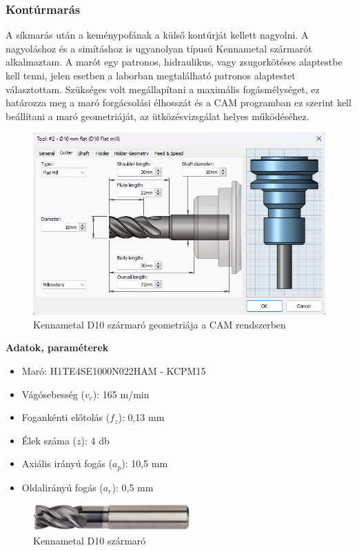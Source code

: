 \documentclass[12pt,a4paper,oneside]{report}
\begin{document}
\subsubsection{Kontúrmarás}
A síkmarás után a keménypofának a külső kontúrját kellett nagyolni. A nagyoláshoz és a simításhoz is ugyanolyan típusú Kennametal szármarót alkalmaztam. A marót egy patronos, hidraulikus, vagy zsugorkötéses alaptestbe kell tenni, jelen esetben a laborban megtalálható patronos alaptestet választottam. Szükséges volt megállapítani a maximális fogásmélységet, ez határozza meg a maró forgácsolási élhosszát és a CAM programban ez szerint kell beállítani a maró geometriáját, az ütközésvizsgálat helyes működéséhez.

\begin{figure}[H]
    \centering
    \includegraphics[width=12.5cm]{figures/d10_flat_geometry.png}
    \caption{Kennametal D10 szármaró geometriája a CAM rendszerben}
    \label{Fig:d10_flat_geometry}
\end{figure}

\textbf{Adatok, paraméterek}
\begin{itemize}
    \item Maró: H1TE4SE1000N022HAM - KCPM15
    \item Vágósebesség ($v_c$): 165 m/min
    \item Fogankénti előtolás ($f_z$): 0,13 mm
    \item Élek száma ($z$): 4 db
    \item Axiális irányú fogás ($a_p$): 10,5 mm
    \item Oldalirányú fogás ($a_e$): 0,5 mm
\end{itemize}

\begin{figure}[H]
    \centering
    \includegraphics[width=6cm]{figures/d10_flatmill.png}
    \caption{Kennametal D10 szármaró}
    \label{Fig:d10_flatmill}
\end{figure}
\end{document}
